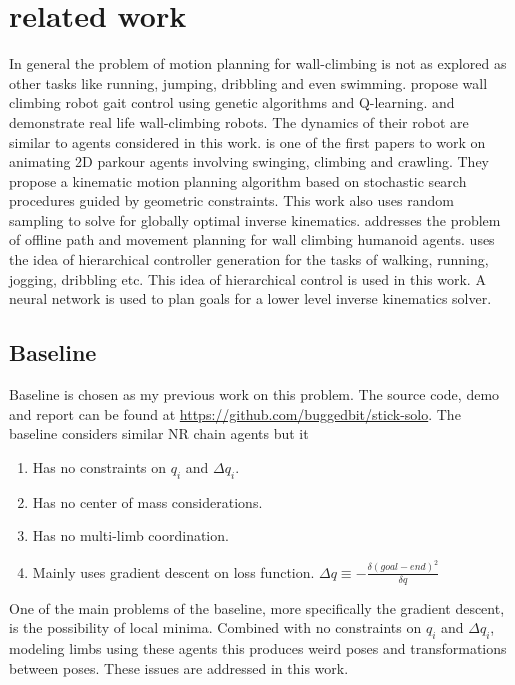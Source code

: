 \documentclass[12pt]{article}
\begin{document}
\section{related work}
In general the problem of motion planning for wall-climbing is not as explored as other tasks like running, jumping, dribbling and even swimming.
\cite{bull1995adaptive} propose wall climbing robot gait control using genetic algorithms and Q-learning.
\cite{Grieco1998ASC} and \cite{351225} demonstrate real life wall-climbing robots. The dynamics of their robot are similar to agents considered in this work.
\cite{kalisiak2001grasp} is one of the first papers to work on animating 2D parkour agents involving swinging, climbing and crawling. They propose a kinematic motion planning algorithm based on stochastic search procedures guided by geometric constraints. This work also uses random sampling to solve for globally optimal inverse kinematics.
\cite{10.1145/3072959.3073707} addresses the problem of offline path and movement planning for wall climbing humanoid agents.
\cite{2017-TOG-deepLoco} uses the idea of hierarchical controller generation for the tasks of walking, running, jogging, dribbling etc. This idea of hierarchical control is used in this work. A neural network is used to plan goals for a lower level inverse kinematics solver.
\subsection{Baseline}
Baseline is chosen as my previous work on this problem.
The source code, demo and report can be found at \url{https://github.com/buggedbit/stick-solo}.
The baseline considers similar NR chain agents but it
\begin{enumerate}[nolistsep]
    \item Has no constraints on $q_i$ and $\Delta q_i$.
    \item Has no center of mass considerations.
    \item Has no multi-limb coordination.
    \item Mainly uses gradient descent on loss function.
    $
            \Delta q \equiv -\frac{\delta (goal - end)^2}{\delta q}
    $
\end{enumerate}
One of the main problems of the baseline, more specifically the gradient descent, is the possibility of local minima.
Combined with no constraints on $q_i$ and $\Delta q_i$, modeling limbs using these agents this produces weird poses and transformations between poses.
These issues are addressed in this work.
\end{document}
